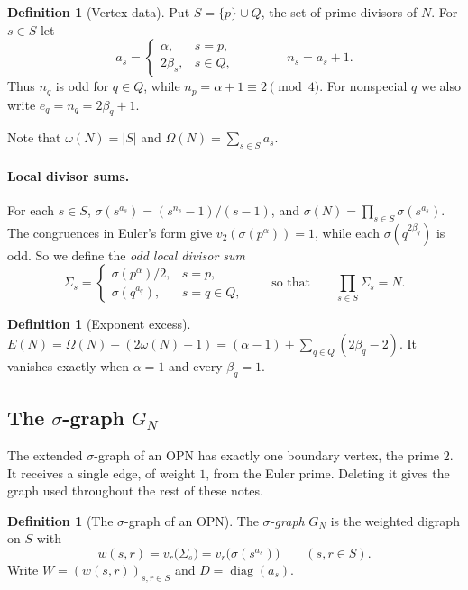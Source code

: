 \documentclass[11pt]{article}
\theoremstyle{definition}
\newtheorem{definition}[theorem]{Definition}
\theoremstyle{remark}
\begin{document}
\begin{definition}[Vertex data]
Put $S=\{p\}\cup Q$, the set of prime divisors of $N$.  For $s\in S$ let
\[
a_s=\begin{cases}\alpha,&s=p,\\ 2\beta_s,&s\in Q,\end{cases}
\qquad\qquad n_s=a_s+1 .
\]
Thus $n_q$ is odd for $q\in Q$, while $n_p=\alpha+1\equiv 2\pmod 4$.  For
nonspecial $q$ we also write $e_q=n_q=2\beta_q+1$.
\end{definition}

Note that $\omega(N)=|S|$ and $\Omega(N)=\sum_{s\in S}a_s$.

\paragraph{Local divisor sums.}
For each $s\in S$, $\sigma(s^{a_s})=(s^{n_s}-1)/(s-1)$, and
$\sigma(N)=\prod_{s\in S}\sigma(s^{a_s})$.  The congruences in Euler's form
give $v_2(\sigma(p^\alpha))=1$, while each $\sigma(q^{2\beta_q})$ is odd.  So
we define the \emph{odd local divisor sum}
\[
\Sigma_s=\begin{cases}\sigma(p^\alpha)/2,&s=p,\\ \sigma(q^{a_q}),&s=q\in Q,\end{cases}
\qquad\text{so that}\qquad \prod_{s\in S}\Sigma_s=N .
\]

\begin{definition}[Exponent excess]
$E(N)=\Omega(N)-(2\omega(N)-1)=(\alpha-1)+\sum_{q\in Q}(2\beta_q-2)$.
It vanishes exactly when $\alpha=1$ and every $\beta_q=1$.
\end{definition}

\subsection{The $\sigma$-graph $G_N$}\label{sec:GN}

The extended $\sigma$-graph of an OPN has exactly one boundary vertex, the
prime $2$.  It receives a single edge, of weight $1$, from the Euler prime.
Deleting it gives the graph used throughout the rest of these notes.

\begin{definition}[The $\sigma$-graph of an OPN]
The \emph{$\sigma$-graph} $G_N$ is the weighted digraph on $S$ with
\[
w(s,r)=v_r\bigl(\Sigma_s\bigr)=v_r\bigl(\sigma(s^{a_s})\bigr)\qquad(s,r\in S).
\]
Write $W=(w(s,r))_{s,r\in S}$ and $D=\operatorname{diag}(a_s)$.
\end{definition}
\end{document}
